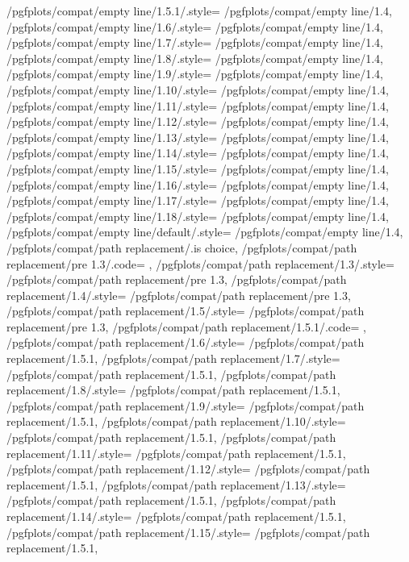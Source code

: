{	/pgfplots/compat/empty line/1.5.1/.style= 	{/pgfplots/compat/empty line/1.4},%
	/pgfplots/compat/empty line/1.6/.style= 	{/pgfplots/compat/empty line/1.4},%
	/pgfplots/compat/empty line/1.7/.style= 	{/pgfplots/compat/empty line/1.4},%
	/pgfplots/compat/empty line/1.8/.style= 	{/pgfplots/compat/empty line/1.4},%
	/pgfplots/compat/empty line/1.9/.style= 	{/pgfplots/compat/empty line/1.4},%
	/pgfplots/compat/empty line/1.10/.style= 	{/pgfplots/compat/empty line/1.4},%
	/pgfplots/compat/empty line/1.11/.style= 	{/pgfplots/compat/empty line/1.4},%
	/pgfplots/compat/empty line/1.12/.style= 	{/pgfplots/compat/empty line/1.4},%
	/pgfplots/compat/empty line/1.13/.style= 	{/pgfplots/compat/empty line/1.4},%
	/pgfplots/compat/empty line/1.14/.style= 	{/pgfplots/compat/empty line/1.4},%
	/pgfplots/compat/empty line/1.15/.style= 	{/pgfplots/compat/empty line/1.4},%
	/pgfplots/compat/empty line/1.16/.style= 	{/pgfplots/compat/empty line/1.4},%
	/pgfplots/compat/empty line/1.17/.style= 	{/pgfplots/compat/empty line/1.4},%
	/pgfplots/compat/empty line/1.18/.style= 	{/pgfplots/compat/empty line/1.4},%
	/pgfplots/compat/empty line/default/.style=	{/pgfplots/compat/empty line/1.4},%
	/pgfplots/compat/path replacement/.is choice,
	/pgfplots/compat/path replacement/pre 1.3/.code= {\pgfplots@path@replace@ellipsefalse},
	/pgfplots/compat/path replacement/1.3/.style=    {/pgfplots/compat/path replacement/pre 1.3},%
	/pgfplots/compat/path replacement/1.4/.style=  	 {/pgfplots/compat/path replacement/pre 1.3},
	/pgfplots/compat/path replacement/1.5/.style=    {/pgfplots/compat/path replacement/pre 1.3},%
	/pgfplots/compat/path replacement/1.5.1/.code=   {\pgfplots@path@replace@ellipsetrue},%
	/pgfplots/compat/path replacement/1.6/.style=   	{/pgfplots/compat/path replacement/1.5.1},
	/pgfplots/compat/path replacement/1.7/.style=   	{/pgfplots/compat/path replacement/1.5.1},
	/pgfplots/compat/path replacement/1.8/.style=   	{/pgfplots/compat/path replacement/1.5.1},
	/pgfplots/compat/path replacement/1.9/.style=   	{/pgfplots/compat/path replacement/1.5.1},
	/pgfplots/compat/path replacement/1.10/.style=   	{/pgfplots/compat/path replacement/1.5.1},
	/pgfplots/compat/path replacement/1.11/.style=   	{/pgfplots/compat/path replacement/1.5.1},
	/pgfplots/compat/path replacement/1.12/.style=   	{/pgfplots/compat/path replacement/1.5.1},
	/pgfplots/compat/path replacement/1.13/.style=   	{/pgfplots/compat/path replacement/1.5.1},
	/pgfplots/compat/path replacement/1.14/.style=   	{/pgfplots/compat/path replacement/1.5.1},
	/pgfplots/compat/path replacement/1.15/.style=   	{/pgfplots/compat/path replacement/1.5.1},
}
